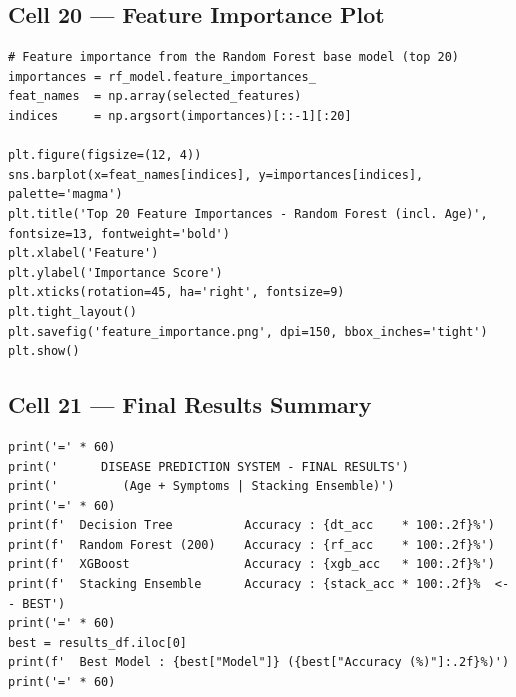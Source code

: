 \documentclass[12pt,a4paper]{article}
\begin{document}
\subsection{Cell 20 --- Feature Importance Plot}

\begin{lstlisting}[caption=Cell 20: Top 20 Feature Importances from Random Forest (incl.\ Age)]
# Feature importance from the Random Forest base model (top 20)
importances = rf_model.feature_importances_
feat_names  = np.array(selected_features)
indices     = np.argsort(importances)[::-1][:20]

plt.figure(figsize=(12, 4))
sns.barplot(x=feat_names[indices], y=importances[indices], palette='magma')
plt.title('Top 20 Feature Importances - Random Forest (incl. Age)', fontsize=13, fontweight='bold')
plt.xlabel('Feature')
plt.ylabel('Importance Score')
plt.xticks(rotation=45, ha='right', fontsize=9)
plt.tight_layout()
plt.savefig('feature_importance.png', dpi=150, bbox_inches='tight')
plt.show()
\end{lstlisting}

\subsection{Cell 21 --- Final Results Summary}

\begin{lstlisting}[caption=Cell 21: Final Results Summary]
print('=' * 60)
print('      DISEASE PREDICTION SYSTEM - FINAL RESULTS')
print('         (Age + Symptoms | Stacking Ensemble)')
print('=' * 60)
print(f'  Decision Tree          Accuracy : {dt_acc    * 100:.2f}%')
print(f'  Random Forest (200)    Accuracy : {rf_acc    * 100:.2f}%')
print(f'  XGBoost                Accuracy : {xgb_acc   * 100:.2f}%')
print(f'  Stacking Ensemble      Accuracy : {stack_acc * 100:.2f}%  <-- BEST')
print('=' * 60)
best = results_df.iloc[0]
print(f'  Best Model : {best["Model"]} ({best["Accuracy (%)"]:.2f}%)')
print('=' * 60)
\end{lstlisting}
\end{document}
